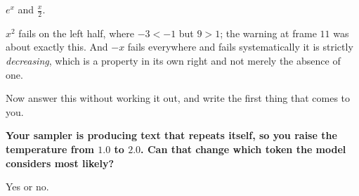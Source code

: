 \begin{fr}
\begin{ansblock}
$e^{x}$ and $\frac{x}{2}$.
\end{ansblock}

$x^{2}$ fails on the left half, where $-3 < -1$ but $9 > 1$; the warning at
frame $11$ was about exactly this. And $-x$ fails everywhere and fails
systematically \dash{} it is strictly \emph{decreasing}, which is a property in
its own right and not merely the absence of one.

Now answer this without working it out, and write the first thing that comes
to you.

\textbf{Your sampler is producing text that repeats itself, so you raise the
temperature from $\num{1.0}$ to $\num{2.0}$. Can that change which token the
model considers most likely?}

Yes or no.
\dotline
\nextframe
\end{fr}

